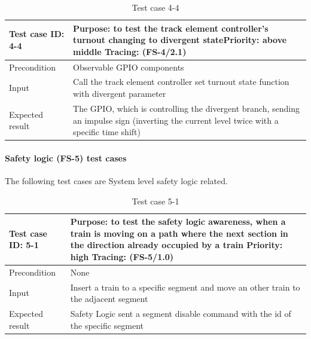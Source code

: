 \begin{table}[H]
	\caption{Test case 4-4}
	\label{table:TCase-FS4-4}
	\begin{center}
		\renewcommand{\arraystretch}{1.8}
		\begin{tabu} 
			to 0.9 \textwidth
			{  X[0.4, c] X[c] }
			\toprule
			Test case ID: 4-4 & Purpose: to test the track element controller's turnout changing to divergent state\newline Priority: above middle \newline Tracing: (FS-4/2.1)\\ \midrule
			Precondition & Observable GPIO components \\
			Input & Call the track element controller set turnout state function with divergent parameter  \\
			Expected result & The GPIO, which is controlling the divergent branch, sending an impulse sign (inverting the current level twice with a specific time shift) \\ \bottomrule
		\end{tabu}
	\end{center}
\end{table}

\paragraph{Safety logic (FS-5) test cases} The following test cases are System level safety logic related.

\begin{table}[H]
	\caption{Test case 5-1}
	\label{table:TCase-FS5-1}
	\begin{center}
		\renewcommand{\arraystretch}{1.8}
		\begin{tabu} 
			to 0.9 \textwidth
			{  X[0.4, c] X[c] }
			\toprule
			Test case ID: 5-1 & Purpose: to test the safety logic awareness, when a train is moving on a path where the next section in the direction already occupied by a train \newline Priority: high \newline Tracing: (FS-5/1.0)\\ \midrule
			Precondition & None  \\
			Input & Insert a train to a specific segment and move an other train to the adjacent segment\\
			Expected result & Safety Logic sent a segment disable command with the id of the specific segment \\ \bottomrule
		\end{tabu}
	\end{center}
\end{table} 


